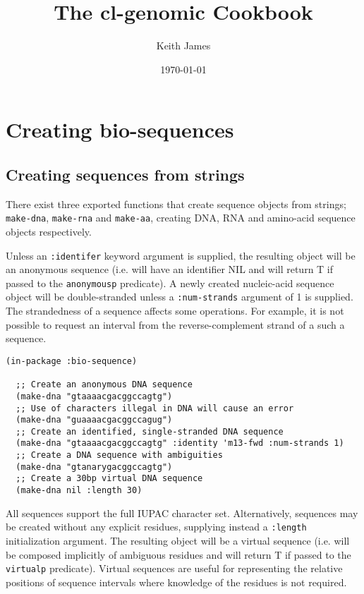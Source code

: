 \documentclass[a4paper, 12pt]{article}
\begin{document}
\title{The cl-genomic Cookbook}
\author{Keith James}
\date{\today}

\maketitle


\section{Creating bio-sequences}
\label{sec:create-bioseq}

\subsection{Creating sequences from strings}
\label{sec:create-bioseq-str}

There exist three exported functions that create sequence objects from
strings; \lstinline!make-dna!, \lstinline!make-rna! and
\lstinline!make-aa!, creating DNA, RNA and amino-acid sequence objects
respectively.

Unless an \lstinline!:identifer! keyword argument is supplied, the
resulting object will be an anonymous sequence (i.e. will have an
identifier NIL and will return T if passed to the
\lstinline!anonymousp! predicate). A newly created nucleic-acid
sequence object will be double-stranded unless a
\lstinline!:num-strands! argument of 1 is supplied. The strandedness
of a sequence affects some operations. For example, it is not possible
to request an interval from the reverse-complement strand of a such a
sequence.

\begin{lstlisting}[caption={Making DNA sequences from strings},
  label=make-dnaseq-string]
  (in-package :bio-sequence)
  
  ;; Create an anonymous DNA sequence
  (make-dna "gtaaaacgacggccagtg")
  ;; Use of characters illegal in DNA will cause an error
  (make-dna "guaaaacgacggccagug")
  ;; Create an identified, single-stranded DNA sequence 
  (make-dna "gtaaaacgacggccagtg" :identity 'm13-fwd :num-strands 1)
  ;; Create a DNA sequence with ambiguities
  (make-dna "gtanarygacggccagtg")
  ;; Create a 30bp virtual DNA sequence
  (make-dna nil :length 30)
\end{lstlisting}

All sequences support the full IUPAC character set. Alternatively,
sequences may be created without any explicit residues, supplying
instead a \lstinline!:length! initialization argument. The resulting
object will be a virtual sequence (i.e. will be composed implicitly of
ambiguous residues and will return T if passed to the
\lstinline!virtualp! predicate). Virtual sequences are useful for
representing the relative positions of sequence intervals where
knowledge of the residues is not required.
\end{document}
